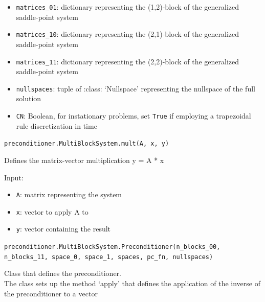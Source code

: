 \documentclass[letterpaper,10pt,english]{sphinxmanual}
\begin{document}
\begin{itemize}
\item \texttt{matrices{\_}01}: dictionary representing the (1,2)-block of the
                generalized saddle-point system

\item \texttt{matrices{\_}10}: dictionary representing the (2,1)-block of the
                generalized saddle-point system

\item \texttt{matrices{\_}11}: dictionary representing the (2,2)-block of the
                generalized saddle-point system

\item \texttt{nullspaces}: tuple of :class: `Nullspace' representing the
                nullspace of the full solution

\item \texttt{CN}: Boolean, for instationary problems, set \texttt{True} if employing a trapezoidal rule discretization in time
\end{itemize}

\vspace{3ex}

\texttt{preconditioner.MultiBlockSystem.mult(A, x, y)}

Defines the matrix-vector multiplication y = A * x

Input:
\begin{itemize}
\item \texttt{A}: matrix representing the system

\item \texttt{x}: vector to apply A to

\item \texttt{y}: vector containing the result
\end{itemize}

\vspace{3ex}

\texttt{preconditioner.MultiBlockSystem.Preconditioner(n{\_}blocks{\_}00, n{\_}blocks{\_}11, space{\_}0, space{\_}1, spaces, pc{\_}fn, nullspaces)}

Class that defines the preconditioner.\\
The class sets up the method `apply' that defines the application of the inverse of the preconditioner to a vector
\end{document}
